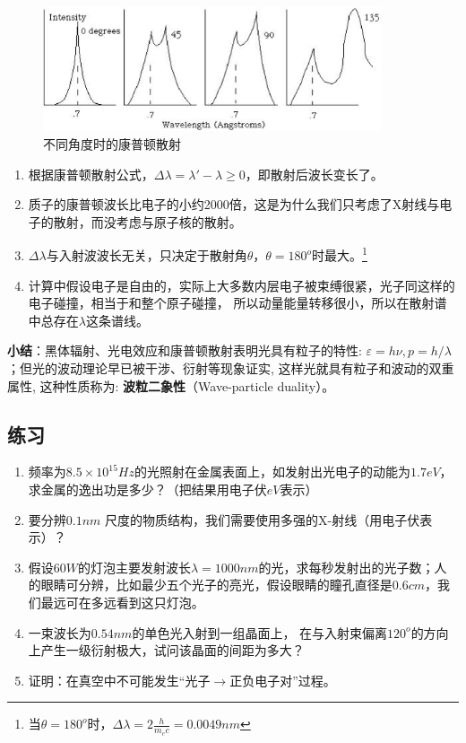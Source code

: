 \begin{figure}[h]
\begin{center}
\includegraphics[width=10cm]{Duality/3-6.ps}
\caption{不同角度时的康普顿散射}
\end{center}
\end{figure}

\begin{enumerate}
    \item 根据康普顿散射公式，$\Delta \lambda  = \lambda ' - \lambda  \ge 0$，即散射后波长变长了。
    \item 质子的康普顿波长比电子的小约2000倍，这是为什么我们只考虑了X射线与电子的散射，而没考虑与原子核的散射。
    \item $\Delta \lambda $与入射波波长无关，只决定于散射角$\theta$，$\theta  = 180^o $时最大。\footnote{当$\theta  = 180^o $时，$\Delta \lambda  = 2\frac{h}{{m_e c}} = 0.0049nm$}
    \item 计算中假设电子是自由的，实际上大多数内层电子被束缚很紧，光子同这样的电子碰撞，相当于和整个原子碰撞，
所以动量能量转移很小，所以在散射谱中总存在$\lambda$这条谱线。
\end{enumerate}


\textbf{小结}：黑体辐射、光电效应和康普顿散射表明光具有粒子的特性:
$\varepsilon = h\nu ,p = h/\lambda
$；但光的波动理论早已被干涉、衍射等现象证实,
这样光就具有粒子和波动的双重属性, 这种性质称为:
\textbf{波粒二象性}（Wave-particle duality）。


\subsection*{练习}

\begin{enumerate}
  \item 频率为$8.5 \times 10^{15} Hz$的光照射在金属表面上，如发射出光电子的动能为$1.7eV$， 求金属的逸出功是多少？（把结果用电子伏$eV$表示）
  \item 要分辨$0.1nm$ 尺度的物质结构，我们需要使用多强的X-射线（用电子伏表示）？
  \item 假设$60W$的灯泡主要发射波长$\lambda = 1000 nm$的光，求每秒发射出的光子数；人的眼睛可分辨，比如最少五个光子的亮光，假设眼睛的瞳孔直径是$0.6cm$，我们最远可在多远看到这只灯泡。
  \item 一束波长为$0.54nm$的单色光入射到一组晶面上，
在与入射束偏离$120^o$的方向上产生一级衍射极大，试问该晶面的间距为多大？
  \item 证明：在真空中不可能发生``光子$\rightarrow$正负电子对''过程。
\end{enumerate}


